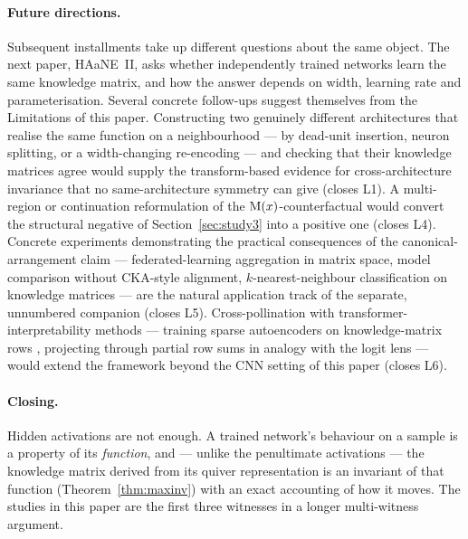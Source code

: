 \paragraph{Future directions.}
Subsequent installments take up different questions about the same
object. The next paper, HAaNE~II, asks whether independently trained
networks learn the same knowledge matrix, and how the answer depends on
width, learning rate and parameterisation. Several concrete follow-ups
suggest themselves from the Limitations of this paper. Constructing two
genuinely different architectures that realise the same function on a
neighbourhood --- by dead-unit insertion, neuron splitting, or a width-changing
re-encoding --- and checking that their knowledge matrices agree would supply the
transform-based evidence for cross-architecture invariance that no
same-architecture symmetry can give (closes L1).
A multi-region or continuation reformulation of the
$\mathrm{M}(x)$-counterfactual would convert the structural negative of
Section~\ref{sec:study3} into a positive one (closes L4). Concrete
experiments demonstrating the practical consequences of the
canonical-arrangement claim --- federated-learning aggregation in matrix
space, model comparison without CKA-style alignment, $k$-nearest-neighbour
classification on knowledge matrices --- are the natural application track
of the separate, unnumbered companion (closes L5). Cross-pollination with
transformer-interpretability methods --- training sparse autoencoders on
knowledge-matrix rows
\citep{bricken2023monosemanticity,templeton2024scaling}, projecting
through partial row sums in analogy with the logit lens
\citep{nostalgebraist2020logitlens} --- would extend the framework
beyond the CNN setting of this paper (closes L6).

\paragraph{Closing.}
Hidden activations are not enough. A trained network's behaviour
on a sample is a property of its \emph{function}, and --- unlike the
penultimate activations --- the knowledge matrix derived from its
quiver representation is an invariant of that function
(Theorem~\ref{thm:maxinv}) with an exact accounting of how it moves.
The studies in this paper are the first three
witnesses in a longer multi-witness argument.
